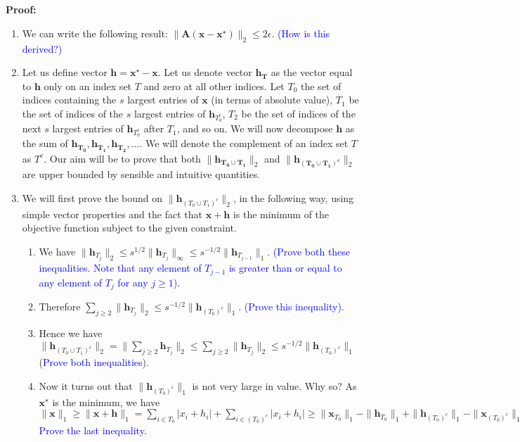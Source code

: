 \documentclass[11pt]{article}
\begin{document}
\begin{enumerate}
\\
\\
\textbf{Proof:}
\\
\begin{enumerate}
\item We can write the following result: $\|\mathbf{A(x-x^{\star})}\|_2 \leq 2\epsilon$. \textcolor{blue}{(How is this derived?)}
\item Let us define vector $\mathbf{h} = \mathbf{x^{\star}-x}$. Let us denote vector $\mathbf{h_T}$ as the vector equal to $\mathbf{h}$ only on an index set $T$ and zero at all other indices. Let $T_0$ the set of indices containing the $s$ largest entries of $\mathbf{x}$ (in terms of absolute value), $T_1$ be the set of indices of the $s$ largest entries of $\mathbf{h}_{T^c_0}$, $T_2$ be the set of indices of the next $s$ largest entries of $\mathbf{h}_{T^c_0}$ after $T_1$, and so on. We will now decompose $\mathbf{h}$ as the sum of $\mathbf{h_{T_0}}, \mathbf{h_{T_1}}, \mathbf{h_{T_2}}, ...$. We will denote the complement of an index set $T$ as $T^c$. Our aim will be to prove that both $\|\mathbf{h_{T_0 \cup T_1}}\|_2$ and $\|\mathbf{h_{(T_0 \cup T_1)^c}}\|_2$ are upper bounded by sensible and intuitive quantities. 
\item We will first prove the bound on $\|\mathbf{h}_{(T_0 \cup T_1)^c}\|_2$, in the following way, using simple vector properties and the fact that $\mathbf{x+h}$ is the minimum of the objective function subject to the given constraint. 
\begin{enumerate}
\item We have $\|\mathbf{h}_{T_j}\|_2 \leq s^{1/2} \|\mathbf{h}_{T_j}\|_\infty \leq s^{-1/2} \|\mathbf{h}_{T_{j-1}}\|_1$. \textcolor{blue}{(Prove both these inequalities. Note that any element of $T_{j-1}$ is greater than or equal to any element of $T_j$ for any $j \geq 1$)}. 
\item Therefore $\sum_{j \geq 2}\|\mathbf{h}_{T_j}\|_2 \leq s^{-1/2} \|\mathbf{h}_{(T_0)^c}\|_1$. \textcolor{blue}{(Prove this inequality)}. 
\item Hence we have $\|\mathbf{h}_{(T_0 \cup T_1)^c}\|_2 = \|\sum_{j \geq 2} \mathbf{h}_{T_j}\|_2 \leq \sum_{j \geq 2} \|\mathbf{h}_{T_j}\|_2 \leq s^{-1/2} \|\mathbf{h}_{(T_0)^c}\|_1$ (\textcolor{blue}{Prove both inequalities}).
\item Now it turns out that $\|\mathbf{h}_{(T_0)^c}\|_1$ is not very large in value. Why so? As $\mathbf{x}^{\star}$ is the minimum, we have $\|\mathbf{x}\|_1 \geq \|\mathbf{x}+\mathbf{h}\|_1 = \sum_{i \in T_0} |x_i + h_i| + \sum_{i \in {(T_0)}^c} |x_i + h_i| \geq \|\mathbf{x}_{T_0}\|_1 - \|\mathbf{h}_{T_0}\|_1 + \|\mathbf{h}_{{(T_0)}^c}\|_1 - \|\mathbf{x}_{{(T_0)^c}}\|_1$ \textcolor{blue}{Prove the last inequality}. 

\end{enumerate}
\end{enumerate}
\end{enumerate}
\end{document}
